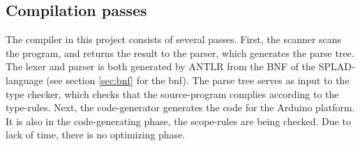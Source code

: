 \subsection{Compilation passes}
\label{sec:CompilationPasses}
The compiler in this project consists of several passes. First, the scanner scans the program, and returns the result to the parser, which generates the parse tree. The lexer and parser is both generated by ANTLR \citep{ANTLR} from the BNF of the SPLAD-language (see section \ref{sec:bnf} for the bnf). The parse tree serves as input to the type checker, which checks that the source-program complies according to the type-rules. Next, the code-generator generates the code for the Arduino platform. It is also in the code-generating phase, the scope-rules are being checked. Due to lack of time, there is no optimizing phase. 